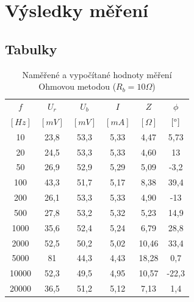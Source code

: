 \documentclass[a4paper, czech]{article}
\begin{document}
\section{Výsledky měření}
 
\subsection{Tabulky}

\begin{table}[H]
    \centering
    \caption{Naměřené a vypočítané hodnoty měření Ohmovou metodou ($R_b = 10 \Omega$)}
    \begin{tabular}{cccccc}
        \toprule
        $f$     & $U_r$   & $U_b$   & $I$    & $Z$     & $\phi$     \\
        $[Hz]$    & $[mV]$   & $[mV]$   & $[mA]$   & $[\Omega]$     & $[\degree]$     \\
        \midrule
        10    & 23,8 & 53,3 & 5,33 & 4,47  & 5,73  \\
        20    & 24,5 & 53,3 & 5,33 & 4,60  & 13    \\
        50    & 26,9 & 52,9 & 5,29 & 5,09  & -3,2  \\
        100   & 43,3 & 51,7 & 5,17 & 8,38  & 39,4  \\
        200   & 26,1 & 53,3 & 5,33 & 4,90  & -13   \\
        500   & 27,8 & 53,2 & 5,32 & 5,23  & 14,9  \\
        1000  & 35,6 & 52,4 & 5,24 & 6,79  & 28,8  \\
        2000  & 52,5 & 50,2 & 5,02 & 10,46 & 33,4  \\
        5000  & 81   & 44,3 & 4,43 & 18,28 & 0,7   \\
        10000 & 52,3 & 49,5 & 4,95 & 10,57 & -22,3 \\
        20000 & 36,5 & 51,2 & 5,12 & 7,13  & 1,4  \\
        \bottomrule
    \end{tabular}
\end{table}
\end{document}
